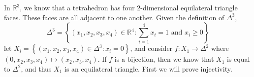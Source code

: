 \documentclass[11pt]{article}
\newcommand{\braces}[1]{\left\{#1\right\}}           %
\newcommand{\R}{\mathbb{R}}
\begin{document}
\pagestyle{fancy}
\fancyhead{}

\normalsize

In $\R^3$, we know that a tetrahedron has four 2-dimensional equilateral triangle faces. These faces are all adjacent to one another. Given the definition of $\Delta^3$,
\[\Delta^3=\braces{(x_1,x_2,x_3,x_4)\in\R^4:\sum_{i=1}^{4}x_i=1\text{ and }x_i\ge0}\]
let $X_i=\braces{(x_1,x_2,x_3,x_4)\in\Delta^3:x_i=0}$, and consider $f:X_1\to\Delta^2$ where $(0,x_2,x_3,x_4)\mapsto(x_2,x_3,x_4)$. If $f$ is a bijection, then we know that $X_1$ is equal to $\Delta^2$, and thus $X_1$ is an equilateral triangle. First we will prove injectivity.
\end{document}
